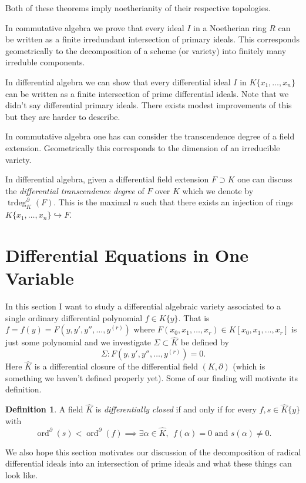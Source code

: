 \documentclass[12pt]{book}
\numberwithin{equation}{section}
\theoremstyle{definition}
\newtheorem{definition}[theorem]{Definition}
\theoremstyle{remark}
\newcommand{\trdeg}{\operatorname{trdeg}}
\newcommand{\ord}{\operatorname{ord}}
\newcommand{\Khat}{\widehat{K}}
\begin{document}
\begin{description}[leftmargin=*]
Both of these theorems imply noetherianity of their respective topologies.

\item[Primary Decompositions] In commutative algebra we prove that every ideal $I$ in a Noetherian ring $R$ can be written as a finite irredundant intersection of primary ideals. 
This corresponds geometrically to the decomposition of a scheme (or variety) into finitely many  irreduble components.

In differential algebra we can show that every differential ideal $I$ in $K\lbrace x_1,\ldots,x_n\rbrace$ can be written as a finite intersection of prime differential ideals.
Note that we didn't say differential primary ideals.
There exists modest improvements of this but they are harder to describe.

\item[Transcendence Degrees] 

In commutative algebra one has can consider the transcendence degree of a field extension. 
Geometrically this corresponds to the dimension of an irreducible variety.

In differential algebra, given a differential field extension $F\supset K$ one can discuss the \emph{differential transcendence degree} of $F$ over $K$ which we denote by $\trdeg_K^{\partial}(F)$.
This is the maximal $n$ such that there exists an injection of rings $K\lbrace x_1,\ldots,x_n\rbrace\hookrightarrow F$.
\end{description}



\section{Differential Equations in One Variable}

In this section I want to study a differential algebraic variety associated to a single ordinary differential polynomial $f \in K\lbrace y \rbrace$.
That is $f = f(y) = F(y,y',y'',\ldots,y^{(r)})$ where $F(x_0,x_1,\ldots,x_r) \in K[x_0,x_1,\ldots,x_r]$ is just some polynomial and we investigate  $\Sigma \subset \widehat{K}$ be defined by 
 $$ \Sigma\colon F(y,y',y'',\ldots, y^{(r)}) =0. $$
Here $\widehat{K}$ is a differential closure of the differential field $(K,\partial)$ (which is something we haven't defined properly yet). 
Some of our finding will motivate its definition.
\begin{definition}
 A field $\widehat{K}$ is \emph{differentially closed} if and only if for every $f,s\in \Khat\lbrace y\rbrace$ with 
 $$\ord^{\partial}(s)<\ord^{\partial}(f) \implies \exists \alpha \in \Khat, \ \ f(\alpha)=0 \mbox{ and } s(\alpha)\neq 0. $$
\end{definition}
We also hope this section motivates our discussion of the decomposition of radical differential ideals into an intersection of prime ideals and what these things can look like. 
\end{document}
